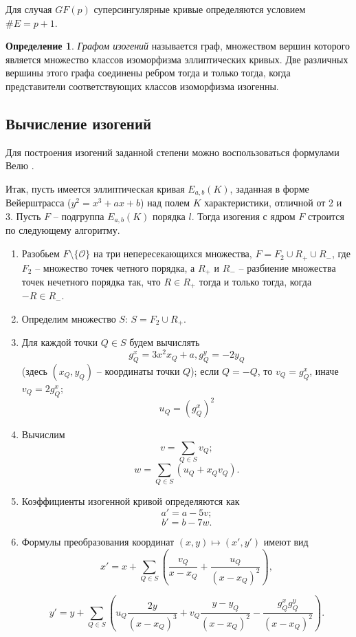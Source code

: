 \documentclass[a4paper,12pt]{article}
\theoremstyle{definition}
\newtheorem{definition}{Определение}
\newtheorem{example}{Пример}
\begin{document}
Для случая $GF(p)$ суперсингулярные кривые определяются условием $\#E=p+1$. %



\begin{definition}
\emph{Графом изогений} называется граф, множеством вершин которого является множество классов изоморфизма эллиптических кривых. 
Две различных вершины этого графа соединены ребром тогда и только тогда, когда представители соответствующих классов изоморфизма изогенны.
\end{definition}

\subsection{Вычисление изогений}

Для построения изогений заданной степени можно воспользоваться формулами Велю \cite{Velu}. 

Итак, пусть имеется эллиптическая кривая $E_{a,b}(K)$, заданная в форме Вейерштрасса ($y^2=x^3+ax+b$) над полем $K$ характеристики, отличной от 2 и 3. Пусть $F$ -- подгруппа $E_{a,b}(K)$ порядка $l$. Тогда изогения с ядром $F$ строится по следующему алгоритму.

\begin{enumerate}
 \item Разобьем $F\setminus\{\mathcal{O}\}$ на три непересекающихся множества, $F=F_2\cup R_+\cup R_-$, где $F_2$ -- множество точек четного порядка,
 а $R_+$ и $R_-$ -- разбиение множества точек нечетного порядка так, что $R\in R_+$ тогда и только тогда, когда $-R\in R_-$.
 \item Определим множество $S$: $S=F_2\cup R_+$.
 \item Для каждой точки $Q\in S$ будем вычислять
 $$
 g_Q^x=3x^2x_Q+a, g_Q^y=-2y_Q
 $$
 (здесь $(x_Q,y_Q)$ -- координаты точки $Q$); 
 если $Q=-Q$, то $v_Q=g_Q^x$, иначе $v_Q=2g_Q^x$;
 $$
 u_Q=(g_Q^x)^2
  $$
  \item Вычислим
  $$
  v=\sum_{Q\in S} v_Q;
  $$
  $$
  w=\sum_{Q\in S} (u_Q+x_Qv_Q).
  $$
\item  Коэффициенты изогенной кривой определяются как 
$$
a'=a-5v;
$$
$$
b'=b-7w.
$$
\item Формулы преобразования координат $(x,y)\mapsto (x',y')$ имеют вид
$$
x'=x+\sum_{Q\in S} \left(\frac{v_Q}{x-x_Q}+\frac{u_Q}{(x-x_Q)^2}\right),
$$

$$
y'=y+\sum_{Q\in S} \left(u_Q\frac{2y}{(x-x_Q)^3}+v_Q\frac{y-y_Q}{(x-x_Q)^2}-\frac{g_Q^xg_Q^y}{(x-x_Q)^2}\right).
$$
  \end{enumerate}
\end{document}
